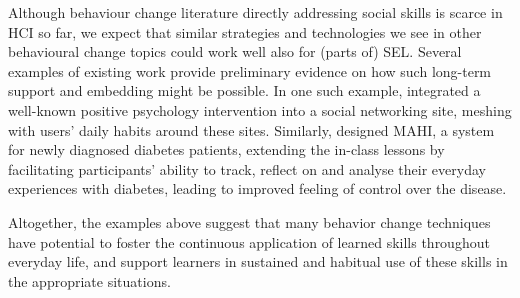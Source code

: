 \documentclass[prodmode,acmtochi]{acmsmall}
\newcommand{\Geraldine}[1]{\textrm{\textbf{\textcolor{Orange}{[[#1]]} } } }
\newcommand{\GeraldineFIX}[1]{}
\newcommand{\GeraldineTODO}[1]{}
\begin{document}
Although behaviour change literature directly addressing social skills is scarce in HCI so far, we expect that  similar strategies and technologies we see in other behavioural change topics could work well also for (parts of) SEL.
Several examples of existing work provide preliminary evidence on how such long-term support and embedding might be possible. %
%
In one such example,  integrated a well-known positive psychology intervention into a social networking site, meshing with users' daily habits around these sites. 
Similarly,  designed MAHI, a system for newly diagnosed diabetes patients, extending the in-class lessons by facilitating participants' ability to track, reflect on and analyse their everyday experiences with diabetes, leading to improved feeling of control over the disease.

Altogether, the examples above suggest that many behavior change techniques have potential to foster the continuous application of learned skills throughout everyday life, and support learners in sustained and habitual use of these skills in the appropriate situations. %




\vfill ~ \pagebreak
\end{document}
